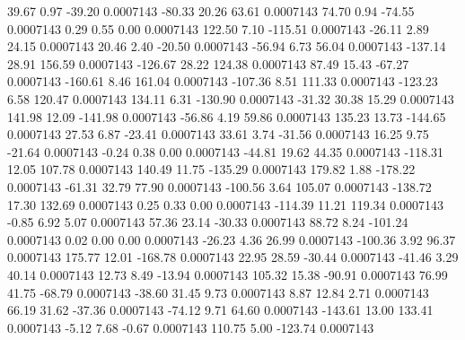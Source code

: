        39.67        0.97      -39.20     0.0007143
      -80.33       20.26       63.61     0.0007143
       74.70        0.94      -74.55     0.0007143
        0.29        0.55        0.00     0.0007143
      122.50        7.10     -115.51     0.0007143
      -26.11        2.89       24.15     0.0007143
       20.46        2.40      -20.50     0.0007143
      -56.94        6.73       56.04     0.0007143
     -137.14       28.91      156.59     0.0007143
     -126.67       28.22      124.38     0.0007143
       87.49       15.43      -67.27     0.0007143
     -160.61        8.46      161.04     0.0007143
     -107.36        8.51      111.33     0.0007143
     -123.23        6.58      120.47     0.0007143
      134.11        6.31     -130.90     0.0007143
      -31.32       30.38       15.29     0.0007143
      141.98       12.09     -141.98     0.0007143
      -56.86        4.19       59.86     0.0007143
      135.23       13.73     -144.65     0.0007143
       27.53        6.87      -23.41     0.0007143
       33.61        3.74      -31.56     0.0007143
       16.25        9.75      -21.64     0.0007143
       -0.24        0.38        0.00     0.0007143
      -44.81       19.62       44.35     0.0007143
     -118.31       12.05      107.78     0.0007143
      140.49       11.75     -135.29     0.0007143
      179.82        1.88     -178.22     0.0007143
      -61.31       32.79       77.90     0.0007143
     -100.56        3.64      105.07     0.0007143
     -138.72       17.30      132.69     0.0007143
        0.25        0.33        0.00     0.0007143
     -114.39       11.21      119.34     0.0007143
       -0.85        6.92        5.07     0.0007143
       57.36       23.14      -30.33     0.0007143
       88.72        8.24     -101.24     0.0007143
        0.02        0.00        0.00     0.0007143
      -26.23        4.36       26.99     0.0007143
     -100.36        3.92       96.37     0.0007143
      175.77       12.01     -168.78     0.0007143
       22.95       28.59      -30.44     0.0007143
      -41.46        3.29       40.14     0.0007143
       12.73        8.49      -13.94     0.0007143
      105.32       15.38      -90.91     0.0007143
       76.99       41.75      -68.79     0.0007143
      -38.60       31.45        9.73     0.0007143
        8.87       12.84        2.71     0.0007143
       66.19       31.62      -37.36     0.0007143
      -74.12        9.71       64.60     0.0007143
     -143.61       13.00      133.41     0.0007143
       -5.12        7.68       -0.67     0.0007143
      110.75        5.00     -123.74     0.0007143
